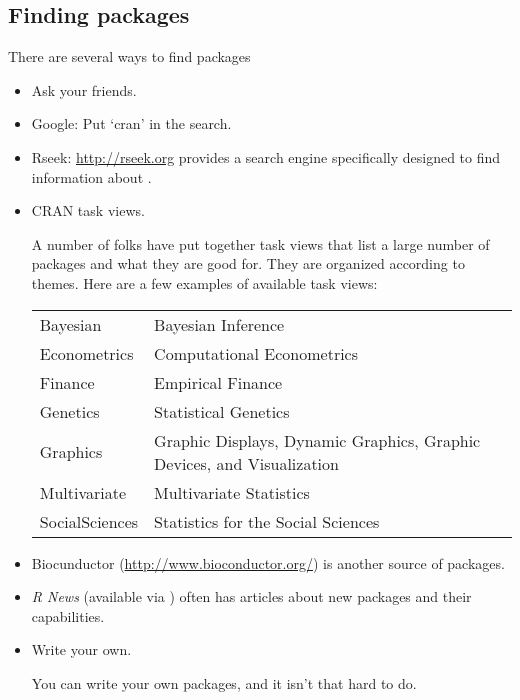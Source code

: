 \subsection{Finding packages}
There are several ways to find packages
\begin{itemize}
  \item Ask your friends.
  \item Google:  Put `cran' in the search.
  \item Rseek:  \url{http://rseek.org} provides a search engine specifically
  designed to find information about \R.
  \item CRAN task views.

  A number of folks have put together task views that list a large
  number of packages and what they are good for.  They are 
  organized according to themes.  Here are a few examples
  of available task views:

  \UndefineShortVerb{\&}
  \begin{center}
    \begin{tabular}{lp{}}
    Bayesian &    Bayesian Inference \\
    Econometrics &   Computational Econometrics \\
    Finance &   Empirical Finance \\
    Genetics &   Statistical Genetics \\
    Graphics &   Graphic Displays,  Dynamic Graphics,
          Graphic Devices, and Visualization \\
    Multivariate &   Multivariate Statistics \\
    SocialSciences &   Statistics for the Social Sciences \\
    \end{tabular}
  \end{center}
  \DefineShortVerb{\&}

  \item Biocunductor (\url{http://www.bioconductor.org/}) is another
  source of packages.

  \item \textit{R News} %
  (available via \cran)
  often has articles about new packages and their capabilities.

  \item Write your own.

  You can write your own packages, and it isn't that hard to do.
\end{itemize}

